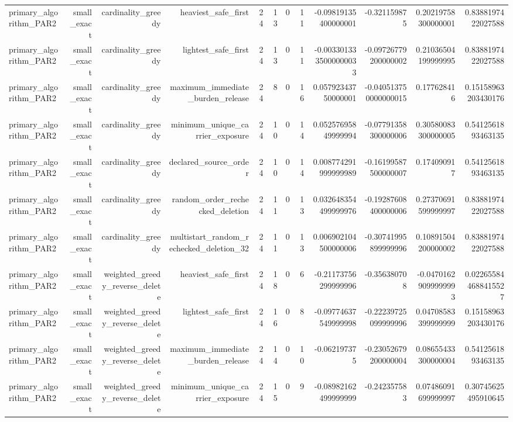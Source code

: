 {\begin{longtable}{lrrrrrrrrrrr}
primary\_algorithm\_PAR2 & small\_exact & cardinality\_greedy & heaviest\_safe\_first & 24 & 13 & 0 & 11 & -0.09819135400000001 & -0.321159875 & 0.20219758300000001 & 0.8388197422027588 \\
primary\_algorithm\_PAR2 & small\_exact & cardinality\_greedy & lightest\_safe\_first & 24 & 13 & 0 & 11 & -0.0033013335000000033 & -0.09726779200000002 & 0.21036504199999995 & 0.8388197422027588 \\
primary\_algorithm\_PAR2 & small\_exact & cardinality\_greedy & maximum\_immediate\_burden\_release & 24 & 8 & 0 & 16 & 0.05792343750000001 & -0.040513750000000015 & 0.177628416 & 0.15158963203430176 \\
primary\_algorithm\_PAR2 & small\_exact & cardinality\_greedy & minimum\_unique\_carrier\_exposure & 24 & 10 & 0 & 14 & 0.05257695849999994 & -0.07791358300000006 & 0.30580083300000005 & 0.5412561893463135 \\
primary\_algorithm\_PAR2 & small\_exact & cardinality\_greedy & declared\_source\_order & 24 & 10 & 0 & 14 & 0.008774291999999989 & -0.16199587500000007 & 0.174090917 & 0.5412561893463135 \\
primary\_algorithm\_PAR2 & small\_exact & cardinality\_greedy & random\_order\_rechecked\_deletion & 24 & 11 & 0 & 13 & 0.032648354499999976 & -0.19287608400000006 & 0.27370691599999997 & 0.8388197422027588 \\
primary\_algorithm\_PAR2 & small\_exact & cardinality\_greedy & multistart\_random\_rechecked\_deletion\_32 & 24 & 11 & 0 & 13 & 0.006902104500000006 & -0.30741995899999996 & 0.10891504200000002 & 0.8388197422027588 \\
primary\_algorithm\_PAR2 & small\_exact & weighted\_greedy\_reverse\_delete & heaviest\_safe\_first & 24 & 18 & 0 & 6 & -0.21173756299999996 & -0.356380708 & -0.04701629099999993 & 0.022655844688415527 \\
primary\_algorithm\_PAR2 & small\_exact & weighted\_greedy\_reverse\_delete & lightest\_safe\_first & 24 & 16 & 0 & 8 & -0.09774637549999998 & -0.22239725099999996 & 0.04708583399999999 & 0.15158963203430176 \\
primary\_algorithm\_PAR2 & small\_exact & weighted\_greedy\_reverse\_delete & maximum\_immediate\_burden\_release & 24 & 14 & 0 & 10 & -0.062197375 & -0.23052679200000004 & 0.08655433300000004 & 0.5412561893463135 \\
primary\_algorithm\_PAR2 & small\_exact & weighted\_greedy\_reverse\_delete & minimum\_unique\_carrier\_exposure & 24 & 15 & 0 & 9 & -0.08982162499999999 & -0.242357583 & 0.07486091699999997 & 0.30745625495910645 \\

\end{longtable}}
